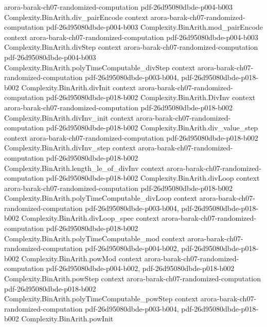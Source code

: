 \begin{theorem}
  {arora-barak-ch07-randomized-computation}
  {pdf-26d95080dbde-p004-b003}
\proofstep
  {Complexity.BinArith.div_pairEncode}
  {context}
  {arora-barak-ch07-randomized-computation}
  {pdf-26d95080dbde-p004-b003}
\proofstep
  {Complexity.BinArith.mod_pairEncode}
  {context}
  {arora-barak-ch07-randomized-computation}
  {pdf-26d95080dbde-p004-b003}
\proofstep
  {Complexity.BinArith.divStep}
  {context}
  {arora-barak-ch07-randomized-computation}
  {pdf-26d95080dbde-p004-b003}
\proofstep
  {Complexity.BinArith.polyTimeComputable_divStep}
  {context}
  {arora-barak-ch07-randomized-computation}
  {pdf-26d95080dbde-p003-b004,
    pdf-26d95080dbde-p018-b002}
\proofstep
  {Complexity.BinArith.divInit}
  {context}
  {arora-barak-ch07-randomized-computation}
  {pdf-26d95080dbde-p018-b002}
\proofstep
  {Complexity.BinArith.DivInv}
  {context}
  {arora-barak-ch07-randomized-computation}
  {pdf-26d95080dbde-p018-b002}
\proofstep
  {Complexity.BinArith.divInv_init}
  {context}
  {arora-barak-ch07-randomized-computation}
  {pdf-26d95080dbde-p018-b002}
\proofstep
  {Complexity.BinArith.div_value_step}
  {context}
  {arora-barak-ch07-randomized-computation}
  {pdf-26d95080dbde-p018-b002}
\proofstep
  {Complexity.BinArith.divInv_step}
  {context}
  {arora-barak-ch07-randomized-computation}
  {pdf-26d95080dbde-p018-b002}
\proofstep
  {Complexity.BinArith.length_le_of_divInv}
  {context}
  {arora-barak-ch07-randomized-computation}
  {pdf-26d95080dbde-p018-b002}
\proofstep
  {Complexity.BinArith.divLoop}
  {context}
  {arora-barak-ch07-randomized-computation}
  {pdf-26d95080dbde-p018-b002}
\proofstep
  {Complexity.BinArith.polyTimeComputable_divLoop}
  {context}
  {arora-barak-ch07-randomized-computation}
  {pdf-26d95080dbde-p003-b004,
    pdf-26d95080dbde-p018-b002}
\proofstep
  {Complexity.BinArith.divLoop_spec}
  {context}
  {arora-barak-ch07-randomized-computation}
  {pdf-26d95080dbde-p018-b002}
\proofstep
  {Complexity.BinArith.polyTimeComputable_mod}
  {context}
  {arora-barak-ch07-randomized-computation}
  {pdf-26d95080dbde-p004-b002,
    pdf-26d95080dbde-p018-b002}
\proofstep
  {Complexity.BinArith.powMod}
  {context}
  {arora-barak-ch07-randomized-computation}
  {pdf-26d95080dbde-p004-b002,
    pdf-26d95080dbde-p018-b002}
\proofstep
  {Complexity.BinArith.powStep}
  {context}
  {arora-barak-ch07-randomized-computation}
  {pdf-26d95080dbde-p018-b002}
\proofstep
  {Complexity.BinArith.polyTimeComputable_powStep}
  {context}
  {arora-barak-ch07-randomized-computation}
  {pdf-26d95080dbde-p003-b004,
    pdf-26d95080dbde-p018-b002}
\proofstep
  {Complexity.BinArith.powInit}

\end{theorem}
